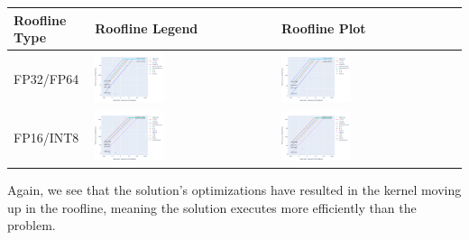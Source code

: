 \documentclass[
]{article}
\begin{document}
\begin{longtable}[]{@{}lll@{}}
\toprule
Roofline Type & Roofline Legend & Roofline Plot\tabularnewline
\midrule
\endhead
FP32/FP64 &
\includegraphics[width=0.4\textwidth,height=0.4\textheight]{omniperf/lds_occupancy_limit/4d764154064d3674ca5c2af5fb80628acc72ed5f.png} &
\includegraphics[width=0.4\textwidth,height=0.4\textheight]{omniperf/lds_occupancy_limit/4bf3d5203e97551cf1af4e09bb575a9494da6c67.png}\tabularnewline
FP16/INT8 &
\includegraphics[width=0.4\textwidth,height=0.4\textheight]{omniperf/lds_occupancy_limit/3358562c2f0191026aa2588c4523ff78fb2e6a6a.png} &
\includegraphics[width=0.4\textwidth,height=0.4\textheight]{omniperf/lds_occupancy_limit/b90d84aa86564be3a7741b32c5d05083b7b9f881.png}\tabularnewline
\bottomrule
\end{longtable}

Again, we see that the solution's optimizations have resulted in the
kernel moving up in the roofline, meaning the solution executes more
efficiently than the problem.
\end{document}
